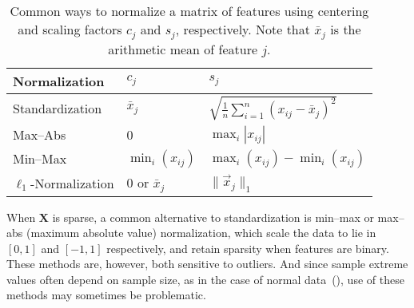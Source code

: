 \begin{table}[hbtp]
  \centering
  \caption{
    Common ways to normalize a matrix of features using centering and scaling
    factors \(c_j\) and \(s_j\), respectively. Note that \(\bar{x}_j\) is
    the arithmetic mean of feature \(j\).
  }
  \label{tab:normalization-types}
  \begin{tabular}{lll}
    \toprule
    Normalization            & \(c_{j}\)          & \(s_j\)                                                   \\
    \midrule
    Standardization          & \(\bar{x}_j\)      & \(\sqrt{\frac{1}{n}\sum_{i=1}^n (x_{ij} - \bar{x}_j)^2}\) \\
    \addlinespace
    Max--Abs                 & 0                  & \(\max_i|x_{ij}|\)                                        \\
    \addlinespace
    Min--Max                 & \(\min_i(x_{ij})\) & \(\max_i(x_{ij}) - \min_i(x_{ij})\)                       \\
    \addlinespace
    \(\ell_1\)-Normalization & 0 or \(\bar{x}_j\) & \(\lVert \vec{x}_j\rVert_1\)                              \\
    \bottomrule
  \end{tabular}
\end{table}

When \(\bm{X}\) is sparse, a common alternative to standardization is min--max or max--abs
(maximum absolute value) normalization, which scale the data to lie in \([0, 1]\) and
\([-1, 1]\) respectively, and retain sparsity when features are binary. These methods are,
however, both sensitive to outliers. And since sample extreme values often depend on sample
size, as in the case of normal data~(), use of these methods may
sometimes be problematic.

